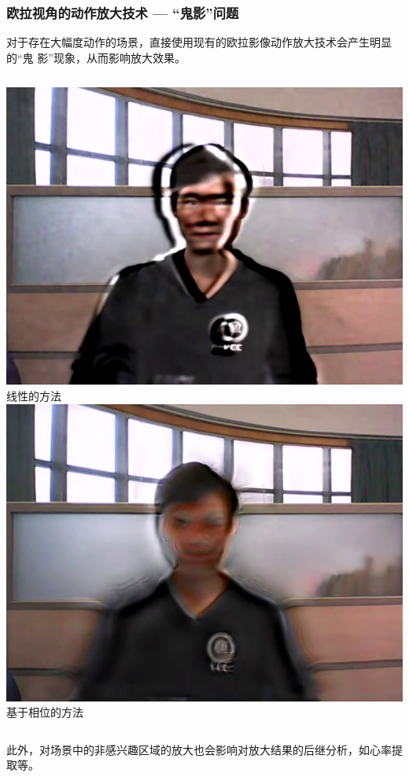 \documentclass[xcolor=svgnames,serif,table]{beamer}
\begin{document}
\begin{frame}
  \frametitle{欧拉视角的动作放大技术 --- “鬼影”问题}

  \small
  
  对于存在大幅度动作的场景，直接使用现有的欧拉影像动作放大技术会产生明显的“鬼
  影”现象，从而影响放大效果。

  \medskip

  \begin{columns}
    \small
    \centering
    \includegraphics[width=.9\textwidth]{ghost-linear.png}\\
    线性的方法
    \centering
    \includegraphics[width=.9\textwidth]{ghost-phase.png}\\
    基于相位的方法
  \end{columns}

  \medskip
  
  此外，对场景中的非感兴趣区域的放大也会影响对放大结果的后继分析，如心率提取等。
\end{frame}
\end{document}
